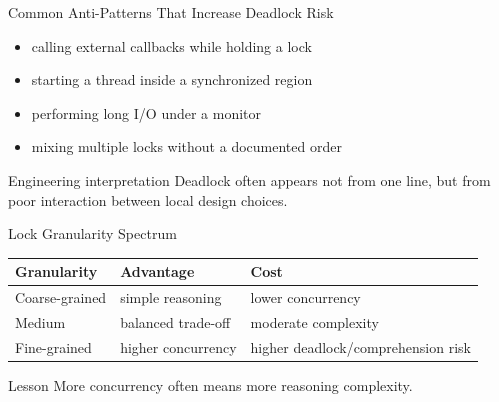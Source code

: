 \documentclass[aspectratio=169,11pt]{beamer}
\begin{document}
	\begin{frame}{Common Anti-Patterns That Increase Deadlock Risk}
		\begin{itemize}
			\item calling external callbacks while holding a lock
			\item starting a thread inside a synchronized region
			\item performing long I/O under a monitor
			\item mixing multiple locks without a documented order
		\end{itemize}
		
		\bigskip
		
		\begin{block}{Engineering interpretation}
			Deadlock often appears not from one line, but from poor interaction between local design choices.
		\end{block}
	\end{frame}
	
	\begin{frame}{Lock Granularity Spectrum}
		\centering
		\begin{tabular}{@{}lll@{}}
			\toprule
			\textbf{Granularity} & \textbf{Advantage} & \textbf{Cost} \\
			\midrule
			Coarse-grained & simple reasoning & lower concurrency \\
			Medium & balanced trade-off & moderate complexity \\
			Fine-grained & higher concurrency & higher deadlock/comprehension risk \\
			\bottomrule
		\end{tabular}
		
		\bigskip
		
		\begin{alertblock}{Lesson}
			More concurrency often means more reasoning complexity.
		\end{alertblock}
	\end{frame}
	
\end{document}
